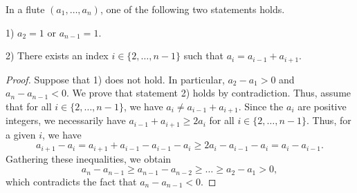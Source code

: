 \begin{lemma}
    \label{lem:FluteReduction}
    \leanok
    In a flute $(a_1, \ldots, a_n)$, one of the following two statements holds.
    
    1) $a_2 = 1$ or $a_{n-1} =1$.
    
    2) There exists an index $i \in \{2,\ldots, n-1\}$ such that $a_i = a_{i-1} + a_{i+1}$.
\end{lemma}
\begin{proof}\leanok
    Suppose that 1) does not hold. In particular, $a_2 - a_1 > 0$ and $a_n - a_{n-1} < 0$. We prove that statement 2) holds by 
    contradiction. Thus, assume that for all $i \in \{2,\ldots, n-1\}$, we have $a_i \neq a_{i-1} + a_{i+1}$. Since the $a_i$ are positive integers,
    we necessarily have $a_{i-1} + a_{i+1} \geq 2 a_i$ for all $i \in \{2,\ldots, n-1\}$. Thus, for a given $i$, we have 
    \[
        a_{i+1} - a_i = a_{i+1} + a_{i-1} - a_{i-1} - a_i \geq 2 a_i - a_{i-1} - a_i = a_i - a_{i-1}.
    \]
    Gathering these inequalities, we obtain
    \[
        a_n - a_{n-1} \geq a_{n-1} - a_{n-2} \geq \ldots \geq a_2 - a_1 > 0,
    \]
    which contradicts the fact that $a_n - a_{n-1} < 0$.
\end{proof}

